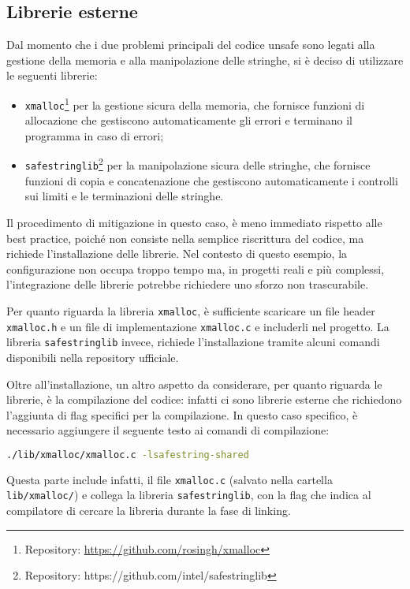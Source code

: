 

\subsection*{Librerie esterne}
\label{sec:librerie-case-study}

Dal momento che i due problemi principali del codice unsafe sono legati alla gestione
della memoria e alla manipolazione delle stringhe, si è deciso di utilizzare le
seguenti librerie:
\begin{itemize}
  \item \texttt{xmalloc}\footnote{Repository: \url{https://github.com/rosingh/xmalloc}}
    per la gestione sicura della memoria, che fornisce funzioni di allocazione
    che gestiscono automaticamente gli errori e terminano il programma in caso
    di errori;

  \item \texttt{safestringlib}\footnote{Repository: https://github.com/intel/safestringlib}
    per la manipolazione sicura delle stringhe, che fornisce funzioni di copia e
    concatenazione che gestiscono automaticamente i controlli sui limiti e le
    terminazioni delle stringhe.
\end{itemize}

Il procedimento di mitigazione in questo caso, è meno immediato rispetto alle best
practice, poiché non consiste nella semplice riscrittura del codice, ma richiede
l'installazione delle librerie. Nel contesto di questo esempio, la configurazione
non occupa troppo tempo ma, in progetti reali e più complessi, l'integrazione delle
librerie potrebbe richiedere uno sforzo non trascurabile.

Per quanto riguarda la libreria \texttt{xmalloc}, è sufficiente scaricare un file
header \texttt{xmalloc.h} e un file di implementazione \texttt{xmalloc.c} e includerli
nel progetto. La libreria \texttt{safestringlib} invece, richiede l'installazione
tramite alcuni comandi disponibili nella repository ufficiale.

\medskip
Oltre all'installazione, un altro aspetto da considerare, per quanto riguarda le
librerie, è la compilazione del codice: infatti ci sono librerie esterne che
richiedono l'aggiunta di flag specifici per la compilazione. In questo caso specifico,
è necessario aggiungere il seguente testo ai comandi di compilazione: \begin{lstlisting}[language=bash, numbers=none]
./lib/xmalloc/xmalloc.c -lsafestring-shared
\end{lstlisting}
Questa parte include infatti, il file \texttt{xmalloc.c} (salvato nella cartella
\texttt{lib/xmalloc/}) e collega la libreria \texttt{safestringlib}, con la flag
che indica al compilatore di cercare la libreria durante la fase di linking.

